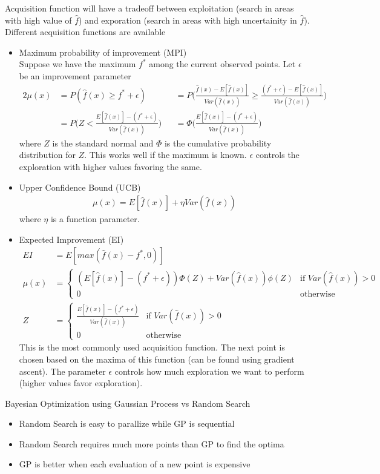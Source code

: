 \documentclass[../../statistical_learning_notes.tex]{subfiles}
\begin{document}
Acquisition function will have a tradeoff between exploitation (search in areas with high value of $\hat{f}$) and exporation (search in areas with high uncertainity in $\hat{f}$). Different acquisition functions are available
\begin{itemize}
    \item Maximum probability of improvement (MPI)\\
    Suppose we have the maximum $f^{*}$ among the current observed points. Let $\epsilon$ be an improvement parameter
    \begin{alignat*}{2}
        \mu(x) &= P(\hat{f}(x) \geq f^{*} + \epsilon) &&= P \bigg(\frac{\hat{f}(x) - E[\hat{f}(x)]}{Var(\hat{f}(x))} \geq \frac{(f^{*} + \epsilon) - E[\hat{f}(x)]}{Var(\hat{f}(x))} \bigg)\\
        &= P \bigg(Z < \frac{E[\hat{f}(x)] - (f^{*} + \epsilon)}{Var(\hat{f}(x))} \bigg) &&= \Phi\bigg(\frac{E[\hat{f}(x)] - (f^{*} + \epsilon)}{Var(\hat{f}(x))} \bigg)
    \end{alignat*}
    where $Z$ is the standard normal and $\Phi$ is the cumulative probability distribution for $Z$. This works well if the maximum is known. $\epsilon$ controls the exploration with higher values favoring the same.
    \item Upper Confidence Bound (UCB)
    \begin{align*}
        \mu(x) = E[\hat{f}(x)] + \eta Var(\hat{f}(x))
    \end{align*}
    where $\eta$ is a function parameter.
    \item Expected Improvement (EI)
    \begin{align*}
        EI &= E[max(\hat{f}(x) - f^{*}, 0)]\\
        \mu(x) &= \begin{cases}
            (E[\hat{f}(x)] - (f^{*} + \epsilon))\Phi(Z) + Var(\hat{f}(x)) \phi(Z) &\mbox{if $Var(\hat{f}(x)) > 0$}\\
            0 &\mbox{otherwise}
        \end{cases}\\
        Z &= \begin{cases} \frac{E[\hat{f}(x)] - (f^{*} + \epsilon)}{Var(\hat{f}(x))} &\mbox{if $Var(\hat{f}(x)) > 0$}\\ 0 &\mbox{otherwise} \end{cases}
    \end{align*}
    This is the most commonly used acquisition function. The next point is chosen based on the maxima of this function (can be found using gradient ascent). The parameter $\epsilon$ controls how much exploration we want to perform (higher values favor exploration).
\end{itemize}

Bayesian Optimization using Gaussian Process vs Random Search
\begin{itemize}
    \item Random Search is easy to parallize while GP is sequential
    \item Random Search requires much more points than GP to find the optima
    \item GP is better when each evaluation of a new point is expensive
\end{itemize}
\end{document}
